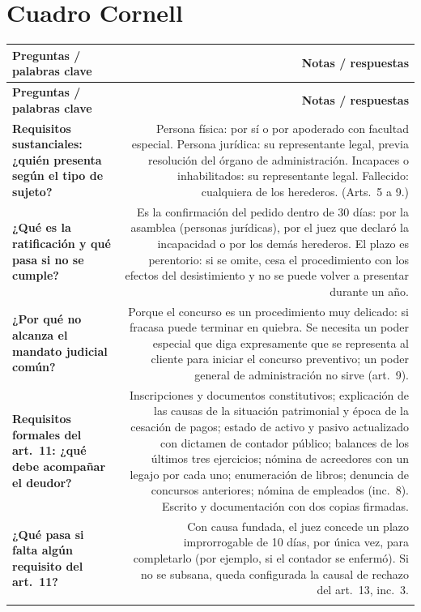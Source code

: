 \documentclass[12pt,oneside]{book}
\begin{document}
\section{Cuadro Cornell}

\begin{longtable}{QN}
\toprule
\textbf{Preguntas / palabras clave} & \textbf{Notas / respuestas} \\
\midrule
\endfirsthead
\toprule
\textbf{Preguntas / palabras clave} & \textbf{Notas / respuestas} \\
\midrule
\endhead

\textbf{Requisitos sustanciales: ¿quién presenta según el tipo de sujeto?} &
Persona física: por sí o por apoderado con facultad especial. Persona jurídica: su representante legal, previa resolución del órgano de administración. Incapaces o inhabilitados: su representante legal. Fallecido: cualquiera de los herederos. (Arts.~5 a 9.) \\
\addlinespace[0.6em]

\textbf{¿Qué es la ratificación y qué pasa si no se cumple?} &
Es la confirmación del pedido dentro de 30 días: por la asamblea (personas jurídicas), por el juez que declaró la incapacidad o por los demás herederos. El plazo es perentorio: si se omite, cesa el procedimiento con los efectos del desistimiento y no se puede volver a presentar durante un año. \\
\addlinespace[0.6em]

\textbf{¿Por qué no alcanza el mandato judicial común?} &
Porque el concurso es un procedimiento muy delicado: si fracasa puede terminar en quiebra. Se necesita un poder especial que diga expresamente que se representa al cliente para iniciar el concurso preventivo; un poder general de administración no sirve (art.~9). \\
\addlinespace[0.6em]

\textbf{Requisitos formales del art.~11: ¿qué debe acompañar el deudor?} &
Inscripciones y documentos constitutivos; explicación de las causas de la situación patrimonial y época de la cesación de pagos; estado de activo y pasivo actualizado con dictamen de contador público; balances de los últimos tres ejercicios; nómina de acreedores con un legajo por cada uno; enumeración de libros; denuncia de concursos anteriores; nómina de empleados (inc.~8). Escrito y documentación con dos copias firmadas. \\
\addlinespace[0.6em]

\textbf{¿Qué pasa si falta algún requisito del art.~11?} &
Con causa fundada, el juez concede un plazo improrrogable de 10 días, por única vez, para completarlo (por ejemplo, si el contador se enfermó). Si no se subsana, queda configurada la causal de rechazo del art.~13, inc.~3. \\
\addlinespace[0.6em]


\end{longtable}
\end{document}
